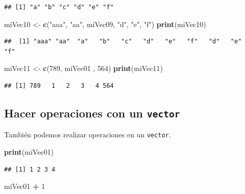 \documentclass[
]{book}
\newenvironment{Shaded}{\begin{snugshade}}{\end{snugshade}}
\newcommand{\DecValTok}[1]{\textcolor[rgb]{0.00,0.00,0.81}{#1}}
\newcommand{\KeywordTok}[1]{\textcolor[rgb]{0.13,0.29,0.53}{\textbf{#1}}}
\newcommand{\NormalTok}[1]{#1}
\newcommand{\OperatorTok}[1]{\textcolor[rgb]{0.81,0.36,0.00}{\textbf{#1}}}
\newcommand{\StringTok}[1]{\textcolor[rgb]{0.31,0.60,0.02}{#1}}
\begin{document}
\begin{verbatim}
## [1] "a" "b" "c" "d" "e" "f"
\end{verbatim}

\begin{Shaded}
\begin{Highlighting}[]
\NormalTok{miVec10 <-}\StringTok{ }\KeywordTok{c}\NormalTok{(}\StringTok{"aaa"}\NormalTok{, }\StringTok{"aa"}\NormalTok{, miVec09, }\StringTok{"d"}\NormalTok{, }\StringTok{"e"}\NormalTok{, }\StringTok{"f"}\NormalTok{)}
\KeywordTok{print}\NormalTok{(miVec10)}
\end{Highlighting}
\end{Shaded}

\begin{verbatim}
##  [1] "aaa" "aa"  "a"   "b"   "c"   "d"   "e"   "f"   "d"   "e"   "f"
\end{verbatim}

\begin{Shaded}
\begin{Highlighting}[]
\NormalTok{miVec11 <-}\StringTok{ }\KeywordTok{c}\NormalTok{(}\DecValTok{789}\NormalTok{, miVec01 , }\DecValTok{564}\NormalTok{)}
\KeywordTok{print}\NormalTok{(miVec11)}
\end{Highlighting}
\end{Shaded}

\begin{verbatim}
## [1] 789   1   2   3   4 564
\end{verbatim}

\hypertarget{hacer-operaciones-con-un-vector}{%
\subsection{\texorpdfstring{Hacer operaciones con un \texttt{vector}}{Hacer operaciones con un vector}}\label{hacer-operaciones-con-un-vector}}

También podemos realizar operaciones en un \texttt{vector}.

\begin{Shaded}
\begin{Highlighting}[]
\KeywordTok{print}\NormalTok{(miVec01)}
\end{Highlighting}
\end{Shaded}

\begin{verbatim}
## [1] 1 2 3 4
\end{verbatim}

\begin{Shaded}
\begin{Highlighting}[]
\NormalTok{miVec01 }\OperatorTok{+}\StringTok{ }\DecValTok{1}
\end{Highlighting}
\end{Shaded}
\end{document}
